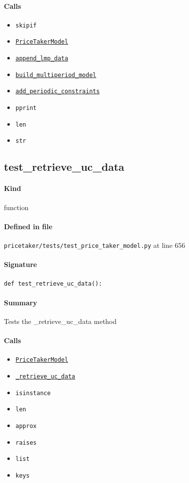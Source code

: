 \documentclass[11pt]{report}
\begin{document}
\paragraph{Calls}
\begin{itemize}[leftmargin=*]
  \item \texttt{skipif}
  \item \hyperref[def:pricetaker-price_taker_model.py:PriceTakerModel:L161]{\texttt{PriceTakerModel}}
  \item \hyperref[def:pricetaker-price_taker_model.py:PriceTakerModel.append_lmp_data:L221]{\texttt{append\_lmp\_data}}
  \item \hyperref[def:pricetaker-price_taker_model.py:PriceTakerModel.build_multiperiod_model:L291]{\texttt{build\_multiperiod\_model}}
  \item \hyperref[def:pricetaker-price_taker_model.py:PriceTakerModel.add_periodic_constraints:L598]{\texttt{add\_periodic\_constraints}}
  \item \texttt{pprint}
  \item \texttt{len}
  \item \texttt{str}
\end{itemize}
\subsection{test\_retrieve\_uc\_data}
\label{def:pricetaker-tests-test_price_taker_model.py:test_retrieve_uc_data:L656}
\paragraph{Kind} function
\paragraph{Defined in file} \texttt{pricetaker/tests/test\_price\_taker\_model.py} at line 656
\paragraph{Signature} \texttt{def test\_retrieve\_uc\_data():}
\paragraph{Summary} Tests the \_retrieve\_uc\_data method
\paragraph{Calls}
\begin{itemize}[leftmargin=*]
  \item \hyperref[def:pricetaker-price_taker_model.py:PriceTakerModel:L161]{\texttt{PriceTakerModel}}
  \item \hyperref[def:pricetaker-price_taker_model.py:PriceTakerModel._retrieve_uc_data:L628]{\texttt{\_retrieve\_uc\_data}}
  \item \texttt{isinstance}
  \item \texttt{len}
  \item \texttt{approx}
  \item \texttt{raises}
  \item \texttt{list}
  \item \texttt{keys}
\end{itemize}
\end{document}
